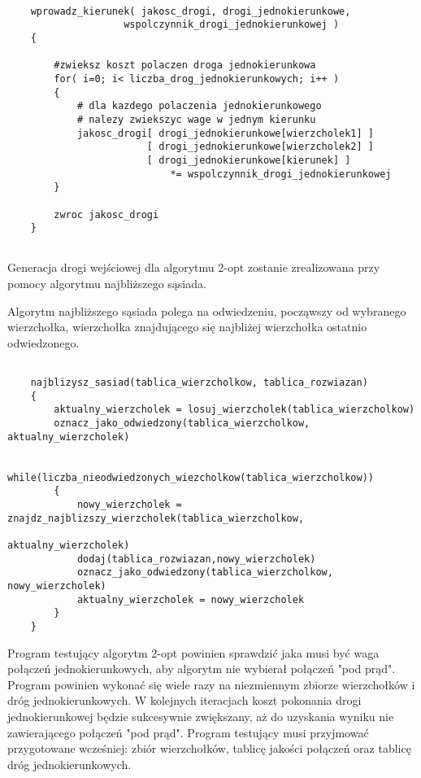 \documentclass{article}
\begin{document}
\newpage
\begin{lstlisting}[caption={Funkcja wprowadzająca koszt połączeń jednokierunkowych}]

	wprowadz_kierunek( jakosc_drogi, drogi_jednokierunkowe,
					wspolczynnik_drogi_jednokierunkowej )
	{	

		#zwieksz koszt polaczen droga jednokierunkowa
		for( i=0; i< liczba_drog_jednokierunkowych; i++ )
		{
			# dla kazdego polaczenia jednokierunkowego
			# nalezy zwiekszyc wage w jednym kierunku
			jakosc_drogi[ drogi_jednokierunkowe[wierzcholek1] ]
						[ drogi_jednokierunkowe[wierzcholek2] ]
						[ drogi_jednokierunkowe[kierunek] ] 
							*= wspolczynnik_drogi_jednokierunkowej
		}		
		
		zwroc jakosc_drogi
	}
		

\end{lstlisting}


Generacja drogi wejściowej dla algorytmu 2-opt zostanie zrealizowana przy pomocy algorytmu najbliższego sąsiada. 

Algorytm najbliższego sąsiada polega na odwiedzeniu, począwszy od wybranego wierzchołka, wierzchołka znajdującego się najbliżej wierzchołka ostatnio odwiedzonego. \\


\begin{lstlisting}[caption={Algorytm najbliższego sąsiada}]

	najblizysz_sasiad(tablica_wierzcholkow, tablica_rozwiazan)
	{
		aktualny_wierzcholek = losuj_wierzcholek(tablica_wierzcholkow)
		oznacz_jako_odwiedzony(tablica_wierzcholkow, aktualny_wierzcholek)
		
		while(liczba_nieodwiedzonych_wiezcholkow(tablica_wierzcholkow))
		{
			nowy_wierzcholek = znajdz_najblizszy_wierzcholek(tablica_wierzcholkow, 
													aktualny_wierzcholek)
			dodaj(tablica_rozwiazan,nowy_wierzcholek)
			oznacz_jako_odwiedzony(tablica_wierzcholkow, nowy_wierzcholek)
			aktualny_wierzcholek = nowy_wierzcholek
		}
	}

\end{lstlisting}



Program testujący algorytm 2-opt powinien sprawdzić jaka musi być waga połączeń jednokierunkowych, aby algorytm nie wybierał połączeń "pod prąd". Program powinien wykonać się wiele razy na niezmiennym zbiorze wierzchołków i dróg jednokierunkowych. W kolejnych iteracjach koszt pokonania drogi jednokierunkowej będzie sukcesywnie zwiększany, aż do uzyskania wyniku nie zawierającego połączeń "pod prąd".
Program testujący musi przyjmować przygotowane wcześniej: zbiór wierzchołków, tablicę jakości połączeń oraz tablicę dróg jednokierunkowych. \\
\end{document}
